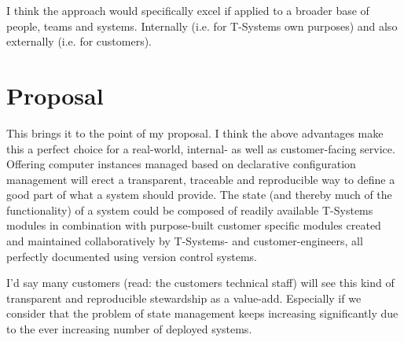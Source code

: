 \documentclass[12pt, a4paper]{article}
\begin{document}
I think the approach would specifically excel if applied to a broader base of people, teams and systems. Internally (i.e. for T-Systems own purposes) and also externally (i.e. for customers).

\section{Proposal}
This brings it to the point of my proposal. I think the above advantages make this a perfect choice for a real-world, internal- as well as customer-facing service. Offering computer instances managed based on declarative configuration management will erect a transparent, traceable and reproducible way to define a good part of what a system should provide. The state (and thereby much of the functionality) of a system could be composed of readily available T-Systems modules in combination with purpose-built customer specific modules created and maintained collaboratively by T-Systems- and customer-engineers, all perfectly documented using version control systems.

I'd say many customers (read: the customers technical staff) will see this kind of transparent and reproducible stewardship as a value-add. Especially if we consider that the problem of state management keeps increasing significantly due to the ever increasing number of deployed systems.
\end{document}
